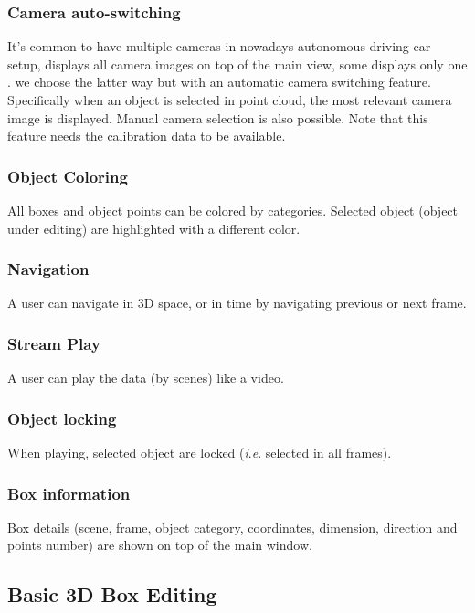 \documentclass[letterpaper, 10 pt, conference]{ieeeconf}  %
\begin{document}
\subsubsection{Camera auto-switching}
It's common to have multiple cameras in nowadays autonomous driving car setup, \cite{Zimmer20193DBA} displays all camera images on top of the main view, some displays only one \cite{scale}. we choose the latter way but with an automatic camera switching feature. Specifically when an object is selected in point cloud, the most relevant camera image is displayed. Manual camera selection is also possible. Note that this feature needs the calibration data to be available.

\subsubsection{Object Coloring}
All boxes and object points can be colored by categories. Selected object (object under editing) are highlighted with a different color.

\subsubsection{Navigation}
\label{section:navigation}
A user can navigate in 3D space, or in time  by navigating previous or next frame. 

\subsubsection{Stream Play}
\label{section:streamplay}
A user can play the data (by scenes) like a video.

\subsubsection{Object locking}
\label{section:object-locking}
When playing, selected object are locked (\textit{i}.\textit{e}. selected in all frames).

\subsubsection{Box information}
Box details (scene, frame, object category, coordinates, dimension, direction and points number) are shown on top of the main window.
 
\subsection{Basic 3D Box Editing}
\end{document}
